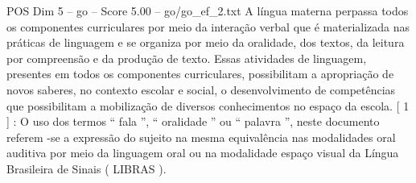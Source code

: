 \begin{textsample}{POS Dim 5 – go – Score 5.00 – go/go\_ef\_2.txt}
A língua materna perpassa todos os componentes curriculares por meio da interação verbal que é materializada nas práticas de linguagem e se organiza por meio da oralidade, dos textos, da leitura por compreensão e da produção de texto.
Essas atividades de linguagem, presentes em todos os componentes curriculares, possibilitam a apropriação de novos saberes, no contexto escolar e social, o desenvolvimento de competências que possibilitam a mobilização de diversos conhecimentos no espaço da escola. [ 1 ] : O uso dos termos “ fala ”, “ oralidade ” ou “ palavra ”, neste documento referem -se a expressão do sujeito na mesma equivalência nas modalidades oral auditiva por meio da linguagem oral ou na modalidade espaço visual da Língua Brasileira de Sinais ( LIBRAS ).

\end{textsample}
